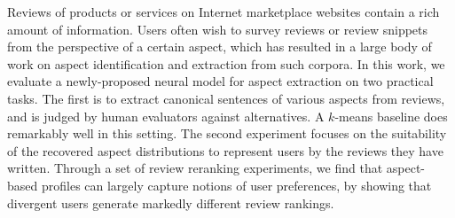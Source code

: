 Reviews of products or services on Internet marketplace websites contain a rich amount of information. Users often wish to survey reviews or review snippets from the perspective of a certain aspect, which has resulted in a large body of work on aspect identification and extraction from such corpora. In this work, we evaluate a newly-proposed neural model for aspect extraction on two practical tasks. The first is to extract canonical sentences of various aspects from reviews, and is judged by human evaluators against alternatives. A $k$-means baseline does remarkably well in this setting. The second experiment focuses on the suitability of the recovered aspect distributions to represent users by the reviews they have written. Through a set of review reranking experiments, we find that aspect-based profiles can largely capture notions of user preferences, by showing that divergent users generate markedly different review rankings.
